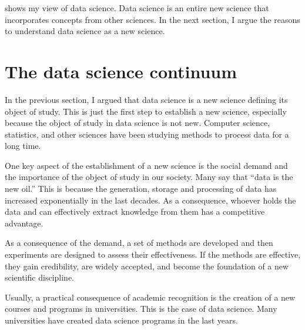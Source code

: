  shows my view of data science.  Data science is an entire new science
that incorporates concepts from other sciences.  In the next section, I argue the reasons
to understand data science as a new science.


\section{The data science continuum}


In the previous section, I argued that data science is a new science defining its object
of study.  This is just the first step to establish a new science, especially because the
object of study in data science is not new.  Computer science, statistics, and other
sciences have been studying methods to process data for a long time.

One key aspect of the establishment of a new science is the social demand and the
importance of the object of study in our society.  Many say that ``data is the new oil.''
This is because the generation, storage and processing of data has increased exponentially
in the last decades.  As a consequence, whoever holds the data and can effectively extract
knowledge from them has a competitive advantage.

As a consequence of the demand, a set of methods are developed and then experiments are
designed to assess their effectiveness.  If the methods are effective, they gain
credibility, are widely accepted, and become the foundation of a new scientific
discipline.

Usually, a practical consequence of academic recognition is the creation of a new courses
and programs in universities.  This is the case of data science.  Many universities have
created data science programs in the last years.

